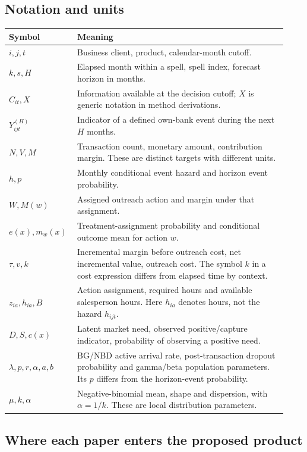\subsection{Notation and units}

\begin{longtable}{P{0.20\linewidth}P{0.73\linewidth}}
\toprule
Symbol & Meaning\\
\midrule
\endhead
$i,j,t$ & Business client, product, calendar-month cutoff.\\
$k,s,H$ & Elapsed month within a spell, spell index, forecast horizon in months.\\
$C_{it},X$ & Information available at the decision cutoff; $X$ is generic notation in method derivations.\\
$Y_{ijt}^{(H)}$ & Indicator of a defined own-bank event during the next $H$ months.\\
$N,V,M$ & Transaction count, monetary amount, contribution margin. These are distinct targets with different units.\\
$h,p$ & Monthly conditional event hazard and horizon event probability.\\
$W,M(w)$ & Assigned outreach action and margin under that assignment.\\
$e(x),m_w(x)$ & Treatment-assignment probability and conditional outcome mean for action $w$.\\
$\tau,v,k$ & Incremental margin before outreach cost, net incremental value, outreach cost. The symbol $k$ in a cost expression differs from elapsed time by context.\\
$z_{ia},h_{ia},B$ & Action assignment, required hours and available salesperson hours. Here $h_{ia}$ denotes hours, not the hazard $h_{ijt}$.\\
$D,S,c(x)$ & Latent market need, observed positive/capture indicator, probability of observing a positive need.\\
$\lambda,p,r,\alpha,a,b$ & BG/NBD active arrival rate, post-transaction dropout probability and gamma/beta population parameters. Its $p$ differs from the horizon-event probability.\\
$\mu,k,\alpha$ & Negative-binomial mean, shape and dispersion, with $\alpha=1/k$. These are local distribution parameters.\\
\bottomrule
\end{longtable}

\subsection{Where each paper enters the proposed product}

